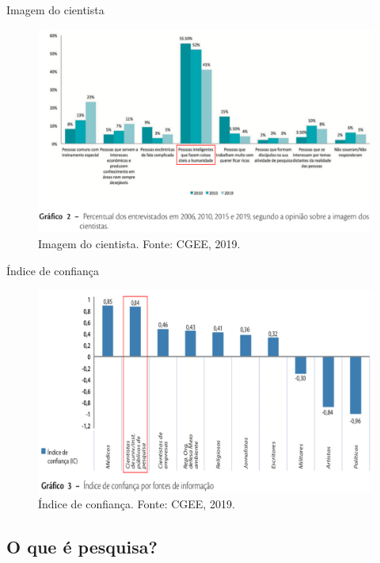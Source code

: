 \begin{frame}{Imagem do cientista}
\begin{figure}
\centering
\includegraphics[scale=0.25]{figs/01/cet-imagem}
\caption{Imagem do cientista. Fonte: CGEE, 2019.}
\end{figure}
\end{frame}

\begin{frame}{Índice de confiança}
\begin{figure}
\centering
\includegraphics[scale=0.25]{figs/01/cet-ic}
\caption{Índice de confiança. Fonte: CGEE, 2019.}
\end{figure}
\end{frame}

\subsection*{O que é pesquisa?}

